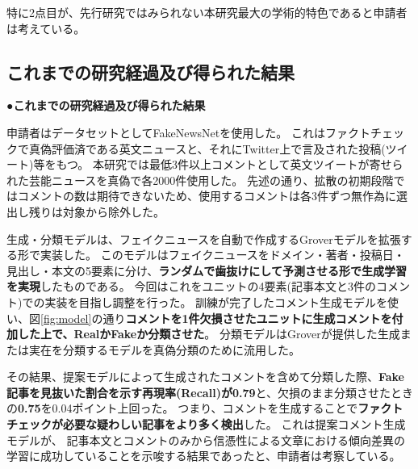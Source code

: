 {	特に2点目が、先行研究ではみられない本研究最大の学術的特色であると申請者は考えている。

	\subsection{これまでの研究経過及び得られた結果}
	\noindent
	●\textbf{これまでの研究経過及び得られた結果}

	申請者はデータセットとしてFakeNewsNet\cite{Shu2018FakeNewsNetAD, shu2017fake}を使用した。
	これはファクトチェックで真偽評価済である英文ニュースと、それにTwitter上で言及された投稿(ツイート)等をもつ。
	本研究では最低3件以上コメントとして英文ツイートが寄せられた芸能ニュースを真偽で各2000件使用した。
	先述の通り、拡散の初期段階ではコメントの数は期待できないため、使用するコメントは各3件ずつ無作為に選出し残りは対象から除外した。

	生成・分類モデルは、フェイクニュースを自動で作成するGroverモデル\cite{NIPS2019_9106}を拡張する形で実装した。
	このモデルはフェイクニュースをドメイン・著者・投稿日・見出し・本文の5要素に分け、\textbf{ランダムで歯抜けにして予測させる形で生成学習を実現}したものである。
	今回はこれをユニットの4要素(記事本文と3件のコメント)での実装を目指し調整を行った。
	訓練が完了したコメント生成モデルを使い、図\ref{fig:model}の通り\textbf{コメントを1件欠損させたユニットに生成コメントを付加した上で、RealかFakeか分類させた}。
	分類モデルはGroverが提供した生成または実在を分類するモデルを真偽分類のために流用した。

	その結果、提案モデルによって生成されたコメントを含めて分類した際、\textbf{Fake記事を見抜いた割合を示す再現率(Recall)が0.79}と、欠損のまま分類させたときの\textbf{0.75}を0.04ポイント上回った。
	つまり、コメントを生成することで\textbf{ファクトチェックが必要な疑わしい記事をより多く検出}した\cite{EasyChair:3190}。
	これは提案コメント生成モデルが、
	記事本文とコメントのみから信憑性による文章における傾向差異の学習に成功していることを示唆する結果であったと、申請者は考察している。

}

